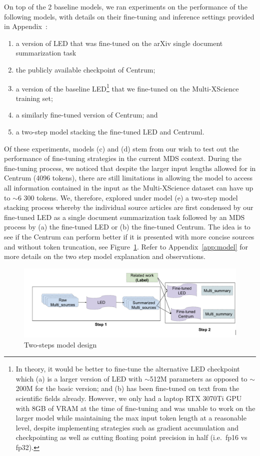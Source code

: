 \documentclass[12pt, twocolumn]{article}
\numberwithin{equation}{section}
\begin{document}
On top of the 2 baseline models, we ran experiments on the performance of the following models, with details on their fine-tuning and inference settings provided in Appendix~\label{app:model}:

\begin{enumerate}
    \item a version of LED that was fine-tuned on the arXiv single document summarization task
    \item the publicly available checkpoint of Centrum;
    \item a version of the baseline LED\footnote{In theory, it would be better to fine-tune the alternative LED checkpoint which (a) is a larger version of LED with $\sim$512M parameters as opposed to $\sim$200M for the basic version; and (b) has been fine-tuned on text from the scientific fields already.  However, we only had a laptop RTX 3070Ti GPU with 8GB of VRAM at the time of fine-tuning and was unable to work on the larger model while maintaining the max input token length at a reasonable level, despite implementing strategies such as gradient accumulation and checkpointing as well as cutting floating point precision in half (i.e.~fp16 vs fp32).} that we fine-tuned on the Multi-XScience training set; 
    \item a similarly fine-tuned version of Centrum; and
    \item a two-step model stacking the fine-tuned LED and Centruml.
\end{enumerate}

Of these experiments, models (c) and (d) stem from our wish to test out the performance of fine-tuning strategies in the current MDS context.  During the fine-tuning process, we noticed that despite the larger input lengths allowed for in Centrum (4096 tokens), there are still limitations in allowing the model to access all information contained in the input as the Multi-XScience dataset can have up to $\sim$6 300 tokens.  We, therefore, explored under model (e) a two-step model stacking process whereby the individual source articles are first condensed by our fine-tuned LED as a single document summarization task followed by an MDS process by (a) the fine-tuned LED or (b) the fine-tuned Centrum.  The idea is to see if the Centrum can perform better if it is presented with more concise sources and without token truncation, see Figure~\ref{fig:two-steps}. Refer to Appendix~\ref{app:model} for more details on the two step model explanation and observations.

\begin{figure}
    \includegraphics[width=\columnwidth]{two_steps.png}
    \caption{Two-steps model design}
    \label{fig:two-steps}
\end{figure}
\end{document}
